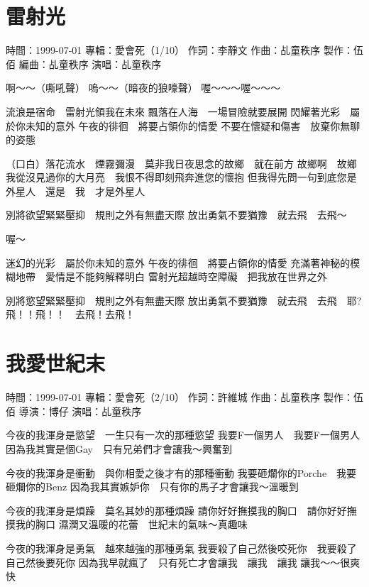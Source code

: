 \documentclass[UTF8,a4paper,oneside,twocolumn,12pt]{ctexbook}
\newcommand{\infopair}[2]{\textbullet #1：#2}
\newcommand{\zc}[1][伍佰]{\infopair{作詞}{#1}}
\newcommand{\zq}[1][伍佰]{\infopair{作曲}{#1}}
\newcommand{\bq}[1][伍佰]{\infopair{編曲}{#1}}
\newcommand{\zj}[1]{\infopair{專輯}{#1}}
\newcommand{\zz}[1]{\infopair{製作}{#1}}
\newcommand{\sj}[1]{\infopair{時間}{#1}}
\newenvironment{info}{\begin{flushleft}\kaishu
	}
	{\end{flushleft}\normalsize\yahei\par}
\newenvironment{lyric}{
	}
{}
\begin{document}
\section{雷射光}
\begin{info}
	\sj{1999-07-01}
	\zj{愛會死（1/10）}
	\zc[李靜文]
	\zq[乩童秩序]
	\zz{伍佰}
	\bq[乩童秩序]
	\infopair{演唱}{乩童秩序}
\end{info}
\begin{lyric}
	啊～～（嘶吼聲）
	嗚～～（暗夜的狼嚎聲）
	喔～～～喔～～～

	流浪是宿命　雷射光領我在未來
	飄落在人海　一場冒險就要展開
	閃耀著光彩　屬於你未知的意外
	午夜的徘徊　將要占領你的情愛
	不要在懷疑和傷害　放棄你無聊的姿態

	（口白）落花流水　煙霧彌漫　莫非我日夜思念的故鄉　就在前方
	故鄉啊　故鄉　我從沒見過你的大月亮　我恨不得即刻飛奔進您的懷抱
	但我得先問一句到底您是外星人　還是　我　才是外星人

	別將欲望緊緊壓抑　規則之外有無盡天際
	放出勇氣不要猶豫　就去飛　去飛～

	喔～

	迷幻的光彩　屬於你未知的意外
	午夜的徘徊　將要占領你的情愛
	充滿著神秘的模糊地帶　愛情是不能夠解釋明白
	雷射光超越時空障礙　把我放在世界之外

	別將慾望緊緊壓抑　規則之外有無盡天際
	放出勇氣不要猶豫　就去飛　去飛　耶?
	飛！！飛！！　去飛！去飛！
\end{lyric}

\section{我愛世紀末}
\begin{info}
	\sj{1999-07-01}
	\zj{愛會死（2/10）}
	\zc[許維城]
	\zq[乩童秩序]
	\zz{伍佰}
	\infopair{導演}{博仔}
	\infopair{演唱}{乩童秩序}
\end{info}
\begin{lyric}
	今夜的我渾身是慾望　一生只有一次的那種慾望
	我要F一個男人　我要F一個男人
	因為我其實是個Gay　只有兄弟們才會讓我～興奮到

	今夜的我渾身是衝動　與你相愛之後才有的那種衝動
	我要砸爛你的Porche　我要砸爛你的Benz
	因為我其實嫉妒你　只有你的馬子才會讓我～溫暖到

	今夜的我渾身是煩躁　莫名其妙的那種煩躁
	請你好好撫摸我的胸口　請你好好撫摸我的胸口
	濕潤又溫暖的花蕾　世紀末的氣味～真趣味

	今夜的我渾身是勇氣　越來越強的那種勇氣
	我要殺了自己然後咬死你　我要殺了自己然後要死你
	因為我早就瘋了　只有死亡才會讓我　讓我　讓我
	讓我～～很爽快
\end{lyric}
\end{document}
